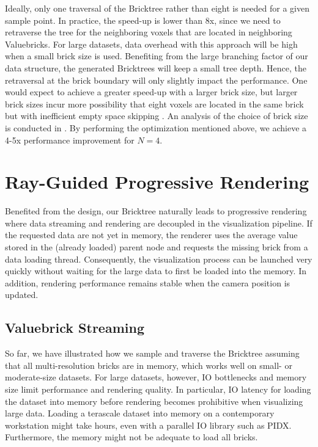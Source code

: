 Ideally, only one traversal of the Bricktree rather than eight is needed for a given 
sample point. In practice, the speed-up is lower than 8x, since we need to
retraverse the tree for the neighboring voxels that are located in neighboring
Valuebricks. 
For large datasets, 
data overhead with this approach will be high when a small brick size is used. Benefiting 
from the large branching factor of our data structure, the generated Bricktrees will keep
a small tree depth. Hence, the retraversal at the brick boundary will only slightly impact the performance. 
One would expect to achieve a greater speed-up with a larger brick size, but larger
brick sizes incur more possibility that eight voxels are located in the same brick
but with inefficient empty space skipping
\cite{fogal2013analysis}. An analysis of the choice of brick size is conducted in
. 
By performing the optimization mentioned above, we achieve a 4-5x
performance improvement for $N=4$. 



\section{Ray-Guided Progressive Rendering}
Benefited from the design, our Bricktree naturally leads to progressive rendering
where data streaming and rendering are decoupled in
the visualization pipeline. If the requested data are not yet in memory, the renderer uses 
the average value stored in the (already loaded) parent node
and requests the missing brick from a data loading thread. Consequently,
the visualization process can be launched very quickly without waiting for the large
data to first be loaded into the memory. In addition, rendering performance remains stable 
when the camera position is updated. 


\subsection{Valuebrick Streaming}
So far, we have illustrated how we sample and traverse the Bricktree assuming that all
multi-resolution bricks are in memory, which works well on small- or moderate-size datasets. 
For large datasets, however, IO bottlenecks and memory size limit performance and rendering
quality. In particular, IO latency for loading the dataset into memory before
rendering becomes prohibitive when visualizing large data. Loading a
terascale dataset into memory on a contemporary workstation might take hours, even with a parallel IO
library such as PIDX. Furthermore, the memory might not be adequate to load all bricks. 


